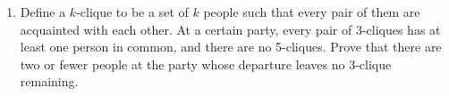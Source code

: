 \documentclass{article}
\begin{document}
\begin{enumerate}
	\item %
	Define a $k$-clique to be a set of $k$ people such that every pair of them are acquainted with each other. At a certain party, every pair of 3-cliques has at least one person in common, and there are no 5-cliques. Prove that there are two or fewer people at the party whose departure leaves no 3-clique remaining.	
	
	
\end{enumerate}
\end{document}

